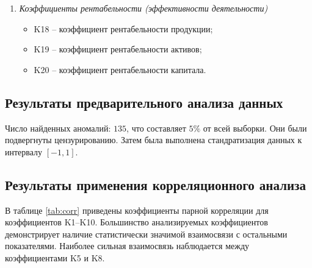 \documentclass[14pt,a4paper]{extarticle}
\begin{document}
\begin{enumerate}[label=\Roman*.]
    \item \textit{Коэффициенты рентабельности (эффективности деятельности)}
    \begin{itemize}
        \item K18 -- коэффициент рентабельности продукции;
        \item K19 -- коэффициент рентабельности активов;
        \item K20 -- коэффициент рентабельности капитала.
    \end{itemize}
\end{enumerate}

\subsection{Результаты предварительного анализа данных}

Число найденных аномалий: $135$, что составляет $5\%$ от всей выборки. Они были 
подвергнуты цензурированию. Затем была выполнена стандратизация данных к интервалу 
$[-1,1]$.

\subsection{Результаты применения корреляционного анализа}

В таблице \ref{tab:corr} приведены коэффициенты парной корреляции для коэффициентов K1--K10. Большинство анализируемых коэффициентов демонстрирует 
наличие статистически значимой взаимосвязи с остальными показателями. Наиболее сильная взаимосвязь 
наблюдается между коэффициентами K5 и K8.
\end{document}
